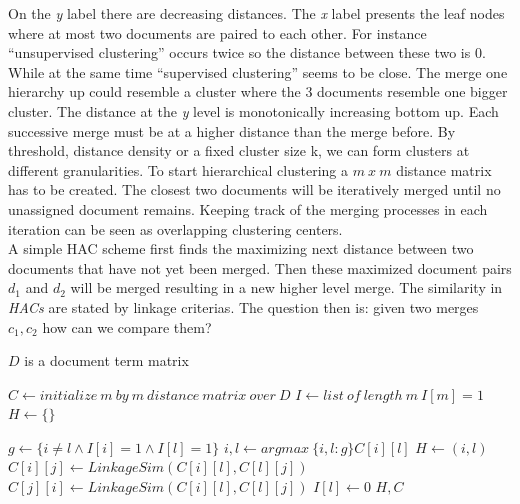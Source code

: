     On the \emph{y} label there are decreasing distances. The \emph{x} label presents the leaf nodes where at most two documents are paired to each other. For instance ``unsupervised clustering'' occurs twice so the distance between these two is 0. While at the same time ``supervised clustering'' seems to be close. The merge one hierarchy up could resemble a cluster where the 3 documents resemble one bigger cluster. The distance at the \emph{y} level is monotonically increasing bottom up. Each successive merge must be at a higher distance than the merge before. By threshold, distance density or a fixed cluster size k, we can form clusters at different granularities. To start hierarchical clustering a $m\:x\:m$ distance matrix has to be created. The closest two documents will be iteratively merged until no unassigned document remains. Keeping track of the merging processes in each iteration can be seen as overlapping clustering centers.\\
    A simple HAC scheme first finds the maximizing next distance between two documents that have not yet been merged. Then these maximized document pairs $d_1$ and $d_2$ will be merged resulting in a new higher level merge. The similarity in \emph{HACs} are stated by linkage criterias. The question then is: given two merges $c_1,c_2$ how can we compare them?

    \begin{algorithm}[H]
    \begin{algorithmic}[1]
      \caption{$D$ is a document term matrix}\label{hac}
        \State $C \gets initialize\:m\:by\:m\:distance\:matrix\:over\:D$
        \State $I \gets list\:of\:length\:m\:I[m]=1$ 
        \State $H \gets \{\}$ 

          \State $g \gets \{i\not=l \wedge I[i]=1 \wedge I[l]=1 \}$
          \State $i,l \gets  argmax\:\{ i,l : g\} C[i][l]$ 
          \State $H \gets (i,l)$ 
           
            \State $C[i][j] \gets LinkageSim(C[i][l], C[l][j])$
            \State $C[j][i] \gets LinkageSim(C[i][l], C[l][j])$
          \EndFor
          \State $I[l] \gets 0$ 
        \EndFor
        \State \Return $H, C$
      \EndFunction
    \end{algorithmic}
    \end{algorithm}

